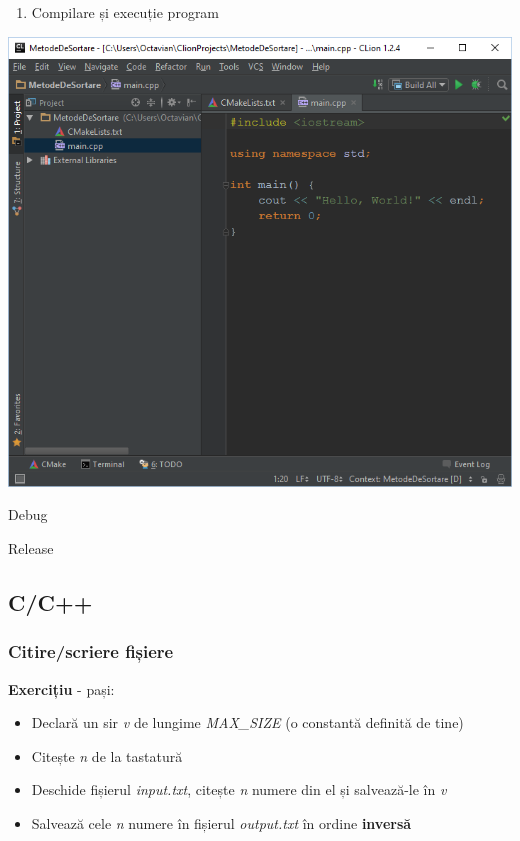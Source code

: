 \documentclass[../ro-fa-lab.tex]{subfiles}
\begin{document}
\begin{enumerate}
\def\labelenumi{\arabic{enumi}.}
\setcounter{enumi}{3}
\item
  Compilare și execuție program
\end{enumerate}

\includegraphics[width=\textwidth]{../Resources/lab0/image10.png}

Debug

Release

\subsection{C/C++}\label{cc}

\subsubsection{Citire/scriere fișiere}\label{citirescriere-fiux219iere}

\textbf{Exercițiu} - pași:

\begin{itemize}
\item
  Declară un sir \emph{v} de lungime \emph{MAX\_SIZE} (o constantă
  definită de tine)
\item
  Citește \emph{n} de la tastatură
\item
  Deschide fișierul \emph{input.txt}, citește \emph{n} numere din el și
  salvează-le în \emph{v}
\item
  Salvează cele \emph{n} numere în fișierul \emph{output.txt} în ordine
  \textbf{inversă}
\end{itemize}
\end{document}
